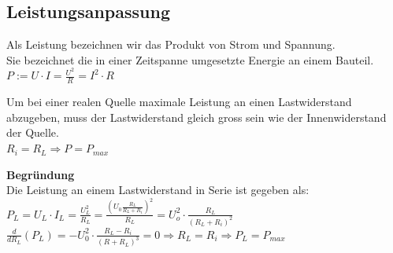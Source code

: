 																				\newpage
										\subsection{Leistungsanpassung}
										\beginip
											Als Leistung bezeichnen wir das Produkt von Strom und Spannung. \\
											Sie bezeichnet die in einer Zeitspanne umgesetzte Energie an einem Bauteil. \\
											\formulaBegin
											$\displaystyle P := U \cdot I = \frac{U^2}{R} = I^2 \cdot R $
											\formulaEnd
										\iend

										\beginip
										Um bei einer realen Quelle maximale Leistung an einen Lastwiderstand abzugeben, muss der Lastwiderstand gleich gross sein wie der Innenwiderstand der Quelle. \\
										\formulaBegin
										$ R_i = R_L \Rightarrow P = P_{max}$
										\formulaEnd
										\begin{center}
										\end{center}
										\iend
										\textbf{Begründung} \\
										Die Leistung an einem Lastwiderstand in Serie ist gegeben als: \\
										$ \displaystyle P_L = U_L \cdot I_L = \frac{U_L^2}{R_L} = \frac{( U_0 \frac{R_L}{R_L + R_i})^2}{R_L} = U_o^2 \cdot \frac{R_L}{(R_L + R_i)^2}$ \\
										$\displaystyle \frac{d}{dR_L} (P_L) = - U_0^2 \cdot \frac{R_L - R_i}{(R + R_L)^3} = 0 \Rightarrow R_L = R_i  \Rightarrow P_L = P_{max}$





















